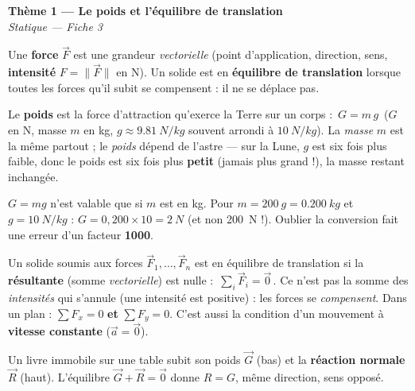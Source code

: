 \documentclass[11pt,a4paper]{article}
\newcommand{\vv}[1]{\vec{#1}}\newcommand{\ds}{\displaystyle}
\begin{document}
\begin{center}
{\LARGE\bfseries\color{primarydark}Thème 1 — Le poids et l'équilibre de translation}\\[2pt]
{\color{primary}\itshape Statique — Fiche 3}
\end{center}
\vspace{1mm}

Une \textbf{force} $\vv F$ est une grandeur \emph{vectorielle} (point d'application, direction, sens,
\textbf{intensité} $F=\lVert\vv F\rVert$ en \si{\newton}). Un solide est en \textbf{équilibre de
translation} lorsque toutes les forces qu'il subit se compensent : il ne se déplace pas.

\begin{cle}[le poids $\vv G = m\,\vv g$]
Le \textbf{poids} est la force d'attraction qu'exerce la Terre sur un corps :
$\boxed{\,G = m\,g\,}$ ($G$ en \si{\newton}, masse $m$ en \si{\kilogram},
$g\approx\qty{9.81}{N/kg}$ souvent arrondi à $\qty{10}{N/kg}$). La \emph{masse} $m$ est la même
partout ; le \emph{poids} dépend de l'astre — sur la Lune, $g$ est six fois plus faible, donc le poids
est six fois plus \textbf{petit} (jamais plus grand !), la masse restant inchangée.
\end{cle}

\begin{piege}
$G=mg$ n'est valable que si $m$ est en \si{\kilogram}. Pour $m=\qty{200}{g}=\qty{0.200}{kg}$ et
$g=\qty{10}{N/kg}$ : $G = 0{,}200\times 10 = \qty{2}{N}$ (et non \qty{200}{N} !). Oublier la
conversion fait une erreur d'un facteur \textbf{1000}.
\end{piege}

\begin{cle}[équilibre de translation : $\sum\vv F=\vv 0$]
Un solide soumis aux forces $\vv F_1,\dots,\vv F_n$ est en équilibre de translation si la
\textbf{résultante} (somme \emph{vectorielle}) est nulle : $\boxed{\,\sum_i \vv F_i = \vv 0\,}$.
Ce n'est pas la somme des \emph{intensités} qui s'annule (une intensité est positive) : les forces se
\emph{compensent}. Dans un plan : $\sum F_x = 0$ \textbf{et} $\sum F_y = 0$. C'est aussi la condition
d'un mouvement à \textbf{vitesse constante} ($\vv a=\vv 0$).
\end{cle}

\begin{exemplebox}
Un livre immobile sur une table subit son poids $\vv G$ (bas) et la \textbf{réaction normale} $\vv R$
(haut). L'équilibre $\vv G+\vv R=\vv 0$ donne $R=G$, même direction, sens opposé.
\hfill
{}
\end{exemplebox}
\end{document}
